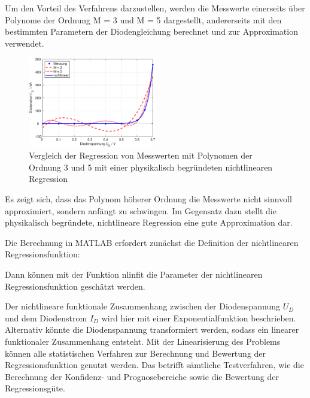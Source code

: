\noindent Um den Vorteil des Verfahrens darzustellen, werden die Messwerte einerseits \"{u}ber Polynome der Ordnung M = 3 und M = 5 dargestellt, andererseits mit den bestimmten Parametern der Diodengleichung berechnet und zur Approximation verwendet. 

\noindent 
\begin{figure}[H]
  \centerline{\includegraphics[width=0.5\textwidth]{Kapitel12/Bilder/image17}}
  \caption{Vergleich der Regression von Messwerten mit Polynomen der Ordnung 3 und 5 mit einer physikalisch begr\"{u}ndeten nichtlinearen Regression}
  \label{fig:RegressionNichtlinDiode}
\end{figure}

\noindent Es zeigt sich, dass das Polynom h\"{o}herer Ordnung die Messwerte nicht sinnvoll approximiert, sondern anf\"{a}ngt zu schwingen. Im Gegensatz dazu stellt die physikalisch begr\"{u}ndete, nichtlineare Regression eine gute Approximation dar.\newline

\noindent Die Berechnung in MATLAB erfordert zun\"{a}chst die Definition der nichtlinearen Regressionsfunktion:



\noindent Dann k\"{o}nnen mit der Funktion nlinfit die Parameter der nichtlinearen Regressionsfunktion gesch\"{a}tzt werden.



\noindent Der nichtlineare funktionale Zusammenhang zwischen der Diodenspannung $U_{D}$ und dem Diodenstrom $I_{D}$ wird hier mit einer Exponentialfunktion beschrieben. Alternativ k\"{o}nnte die Diodenspannung transformiert werden, sodass ein linearer funktionaler Zusammenhang entsteht. Mit der Linearisierung des Problems k\"{o}nnen alle statistischen Verfahren zur Berechnung und Bewertung der Regressionsfunktion genutzt werden. Das betrifft s\"{a}mtliche Testverfahren, wie die Berechnung der Konfidenz- und Prognosebereiche sowie die Bewertung der Regressionsg\"{u}te. 

